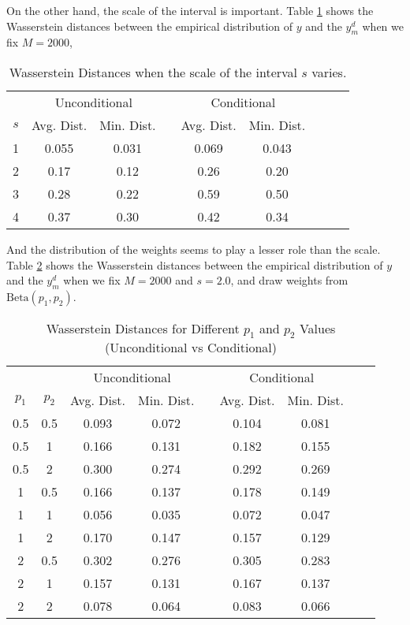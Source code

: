 \documentclass[12pt]{article}
\begin{document}
    On the other hand, the scale of the interval is important. Table \ref{tab:wasserstein-scale} shows the Wasserstein distances between the empirical distribution of \(y\) and the \(y^{d}_{m}\) when we fix \(M = 2000\), 
    \begin{table}[htbp]
        \centering
        \begin{tabular}{ccccccccc}
            \hline
            & \multicolumn{2}{c}{Unconditional} & & \multicolumn{2}{c}{Conditional} \\
            \cline{2-3} \cline{5-6}
            \(s\) & Avg. Dist. & Min. Dist. & & Avg. Dist. & Min. Dist. \\
            \hline
            1 & 0.055 & 0.031 & & 0.069 & 0.043 \\
            2 & 0.17 & 0.12 & & 0.26& 0.20 \\
            3 & 0.28& 0.22 & & 0.59 & 0.50 \\
            4 & 0.37 & 0.30 & & 0.42 & 0.34 \\
            \hline
        \end{tabular}
        \caption{Wasserstein Distances when the scale of the interval \(s\) varies.}
        \label{tab:wasserstein-scale}
    \end{table}
    
    And the distribution of the weights seems to play a lesser role than the scale. Table \ref{tab:wasserstein-Beta} shows the Wasserstein distances between the empirical distribution of \(y\) and the \(y^{d}_{m}\) when we fix \(M = 2000\) and \(s = 2.0\), and draw weights from \(\text{Beta}(p_{1},p_{2})\). 

    \begin{table}[htbp]
        \centering
        \begin{tabular}{ccccccccc}
            \hline
            && \multicolumn{2}{c}{Unconditional} & & \multicolumn{2}{c}{Conditional} \\
            \cline{3-4} \cline{6-7}
            \(p_{1}\) & \(p_{2}\) & Avg. Dist. & Min. Dist. & & Avg. Dist. & Min. Dist. \\
            \hline
            0.5 & 0.5 & 0.093 & 0.072 & & 0.104 & 0.081 \\
            0.5 & 1 & 0.166 & 0.131 & & 0.182 & 0.155 \\
            0.5 & 2 & 0.300 & 0.274 & & 0.292 & 0.269 \\
            1 & 0.5 & 0.166 & 0.137 & & 0.178 & 0.149 \\
            1 & 1 & 0.056 & 0.035 & & 0.072 & 0.047 \\
            1 & 2 & 0.170 & 0.147 & & 0.157 & 0.129 \\
            2 & 0.5 & 0.302 & 0.276 & & 0.305 & 0.283 \\
            2 & 1 & 0.157 & 0.131 & & 0.167 & 0.137 \\
            2 & 2 & 0.078 & 0.064 & & 0.083 & 0.066 \\
            \hline
        \end{tabular}
        \caption{Wasserstein Distances for Different \(p_{1}\) and \(p_{2}\) Values (Unconditional vs Conditional)}
        \label{tab:wasserstein-Beta}
    \end{table}
    \newpage
\end{document}
